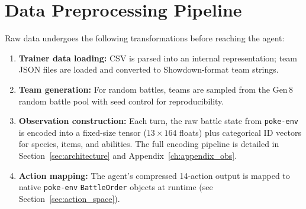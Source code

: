 \section{Data Preprocessing Pipeline}

Raw data undergoes the following transformations before reaching the agent:

\begin{enumerate}
  \item \textbf{Trainer data loading:} CSV is parsed into an internal
        representation; team JSON files are loaded and converted to
        Showdown-format team strings.
  \item \textbf{Team generation:} For random battles, teams are sampled from
        the Gen\,8 random battle pool with seed control for reproducibility.
  \item \textbf{Observation construction:} Each turn, the raw battle state
        from \texttt{poke-env} is encoded into a fixed-size tensor
        ($13 \times 164$ floats) plus categorical ID vectors for species,
        items, and abilities.  The full encoding pipeline is detailed in
        Section~\ref{sec:architecture} and Appendix~\ref{ch:appendix_obs}.
  \item \textbf{Action mapping:} The agent's compressed 14-action output is
        mapped to native \texttt{poke-env} \texttt{BattleOrder} objects at
        runtime (see Section~\ref{sec:action_space}).
\end{enumerate}
